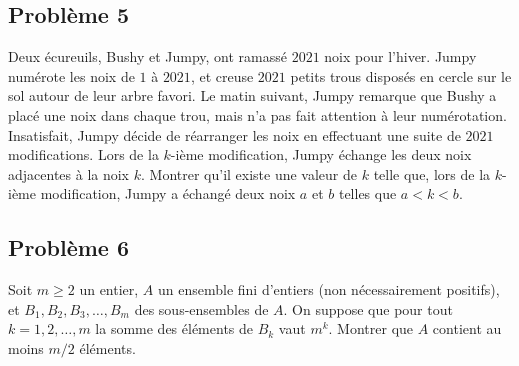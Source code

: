 \subsection*{Problème 5}
Deux écureuils, Bushy et Jumpy, ont ramassé $2021$ noix pour l'hiver. Jumpy numérote les noix de $1$ à $2021$,
et creuse $2021$ petits trous disposés en cercle sur le sol autour de leur arbre favori. Le matin suivant,
Jumpy remarque que Bushy a placé une noix dans chaque trou, mais n'a pas fait attention à leur numérotation.
Insatisfait, Jumpy décide de réarranger les noix en effectuant une suite de $2021$ modifications. Lors de la
$k$-ième modification, Jumpy échange les deux noix adjacentes à la noix $k$. Montrer qu'il existe une valeur
de $k$ telle que, lors de la $k$-ième modification, Jumpy a échangé deux noix $a$ et $b$ telles que $a < k < b$.

\subsection*{Problème 6}
Soit $m \geqslant 2$ un entier, $A$ un ensemble fini d'entiers (non nécessairement positifs), et
$B_1, B_2, B_3, \ldots, B_m$ des sous-ensembles de $A$. On suppose que pour tout $k = 1, 2, \ldots, m$ la somme
des éléments de $B_k$ vaut $m^k$. Montrer que $A$ contient au moins $m/2$ éléments.

